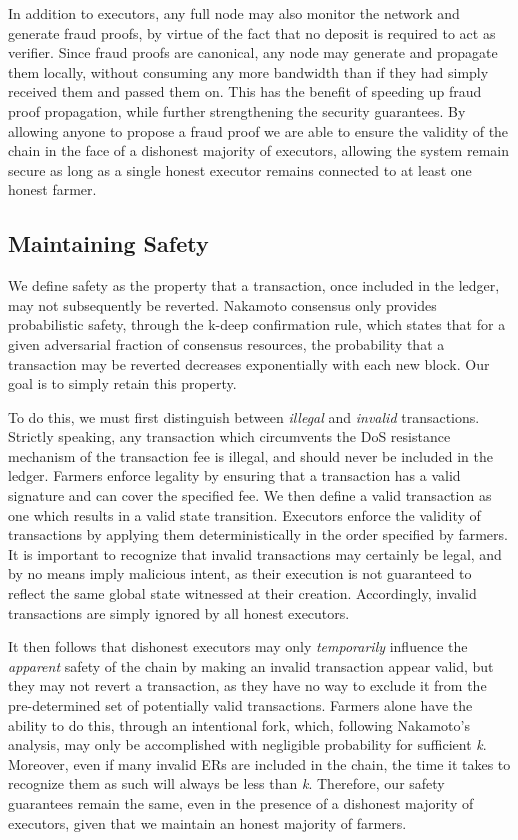 \documentclass[conference]{IEEEtran}
\begin{document}
In addition to executors, any full node may also monitor the network and generate fraud proofs, by virtue of the fact that no deposit is required to act as verifier. Since fraud proofs are canonical, any node may generate and propagate them locally, without consuming any more bandwidth than if they had simply received them and passed them on. This has the benefit of speeding up fraud proof propagation, while further strengthening the security guarantees. By allowing anyone to propose a fraud proof we are able to ensure the validity of the chain in the face of a dishonest majority of executors, allowing the system remain secure as long as a single honest executor remains connected to at least one honest farmer.

\subsection{Maintaining Safety}

We define safety as the property that a transaction, once included in the ledger, may not subsequently be reverted. Nakamoto consensus only provides probabilistic safety, through the k-deep confirmation rule, which states that for a given adversarial fraction of consensus resources, the probability that a transaction may be reverted decreases exponentially with each new block. Our goal is to simply retain this property. 

To do this, we must first distinguish between \textit{illegal} and \textit{invalid} transactions. Strictly speaking, any transaction which circumvents the DoS resistance mechanism of the transaction fee is illegal, and should never be included in the ledger. Farmers enforce legality by ensuring that a transaction has a valid signature and can cover the specified fee. We then define a valid transaction as one which results in a valid state transition. Executors enforce the validity of transactions by applying them deterministically in the order specified by farmers. It is important to recognize that invalid transactions may certainly be legal, and by no means imply malicious intent, as their execution is not guaranteed to reflect the same global state witnessed at their creation. Accordingly, invalid transactions are simply ignored by all honest executors. 

It then follows that dishonest executors may only \textit{temporarily} influence the \textit{apparent} safety of the chain by making an invalid transaction appear valid, but they may not revert a transaction, as they have no way to exclude it from the pre-determined set of potentially valid transactions. Farmers alone have the ability to do this, through an intentional fork, which, following Nakamoto’s analysis, may only be accomplished with negligible probability for sufficient \textit{k}\cite{bitcoin}. Moreover, even if many invalid ERs are included in the chain, the time it takes to recognize them as such will always be less than \textit{k}. Therefore, our safety guarantees remain the same, even in the presence of a dishonest majority of executors, given that we maintain an honest majority of farmers. 
\end{document}
